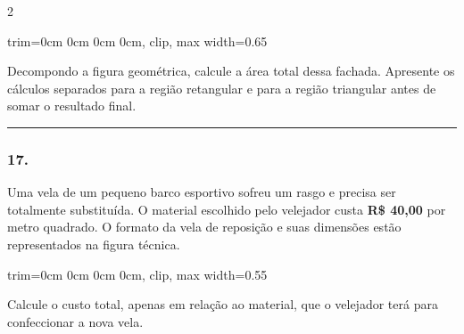 \documentclass[twoside, 10pt, a4paper]{article}
\newlength{\espacoPreQuestao}\setlength{\espacoPreQuestao}{0.1cm}
\newlength{\espacoQuestao}\setlength{\espacoQuestao}{0.2cm}
\begin{document}
\begin{multicols*}{2}
\begin{center}
\begin{adjustbox}{trim=0cm 0cm 0cm 0cm, clip, max width=0.65\linewidth}
\end{adjustbox}
\end{center}

Decompondo a figura geométrica, calcule a área total dessa fachada. Apresente os cálculos separados para a região retangular e para a região triangular antes de somar o resultado final.
\par\vspace{\espacoQuestao}

\noindent\textcolor{CorLinha}{\rule{\linewidth}{0.5pt}} 
\par\vspace{\espacoPreQuestao}
\subsubsection*{17.} Uma vela de um pequeno barco esportivo sofreu um rasgo e precisa ser totalmente substituída. O material escolhido pelo velejador custa \textbf{R\$ 40,00} por metro quadrado. O formato da vela de reposição e suas dimensões estão representados na figura técnica.

\begin{center}
\begin{adjustbox}{trim=0cm 0cm 0cm 0cm, clip, max width=0.55\linewidth}
\end{adjustbox}
\end{center}

Calcule o custo total, apenas em relação ao material, que o velejador terá para confeccionar a nova vela.
\par\vspace{\espacoQuestao}


\end{multicols*}
\end{document}
